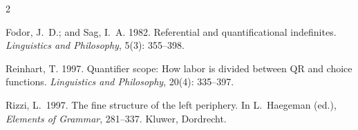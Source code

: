 \documentclass[letterpaper]{article}
\begin{document}
\begin{thebibliography}{2}

Fodor, J.~D.; and Sag, I.~A. 1982.
Referential and quantificational indefinites.
\emph{Linguistics and Philosophy}, 5(3): 355--398.

Reinhart, T. 1997.
Quantifier scope: How labor is divided between QR and choice functions.
\emph{Linguistics and Philosophy}, 20(4): 335--397.

Rizzi, L.\ 1997.
The fine structure of the left periphery.
In L.~Haegeman (ed.), \emph{Elements of Grammar}, 281--337.
Kluwer, Dordrecht.

\end{thebibliography}
\end{document}
